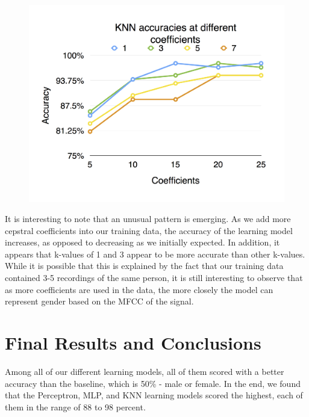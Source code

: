\documentclass{article}
\begin{document}
\begin{figure}[H]
\includegraphics[width=\linewidth]{KNN_accuracies_with_different_coeff}
\end{figure}

It is interesting to note that an unusual pattern is emerging.  As we add more cepstral coefficients into our training data, the accuracy of the learning model increases, as opposed to decreasing as we initially expected.  In addition, it appears that k-values of 1 and 3 appear to be more accurate than other k-values.  While it is possible that this is explained by the fact that our training data contained 3-5 recordings of the same person, it is still interesting to observe that as more coefficients are used in the data, the more closely the model can represent gender based on the MFCC of the signal.

\section{Final Results and Conclusions}

Among all of our different learning models, all of them scored with a better accuracy than the baseline, which is 50\% - male or female. In the end, we found that the Perceptron, MLP, and KNN learning models scored the highest, each of them in the range of  88 to 98 percent.
\end{document}
